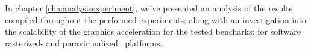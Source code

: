 In chapter \ref{cha:analysisexperiment}, we've presented an analysis of the results compiled throughout the performed experiments; along with an investigation into the scalability of the graphics acceleration for the tested bencharks; for software rasterized- and paravirtualized \dvttermsimics\ platforms.


